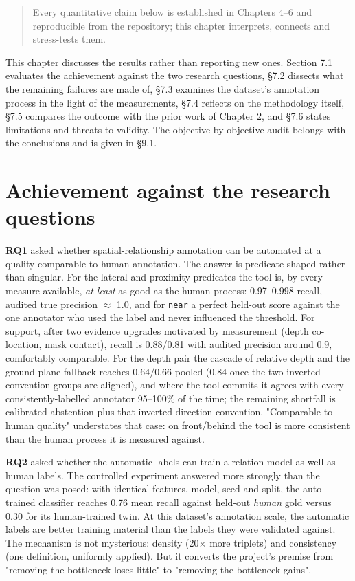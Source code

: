 
\begin{quote}
Every quantitative claim below is established in Chapters 4--6 and reproducible from the repository; this chapter interprets, connects and stress-tests them.
\end{quote}

This chapter discusses the results rather than reporting new ones. Section 7.1 evaluates the achievement against the two research questions, \S7.2 dissects what the remaining failures are made of, \S7.3 examines the dataset's annotation process in the light of the measurements, \S7.4 reflects on the methodology itself, \S7.5 compares the outcome with the prior work of Chapter 2, and \S7.6 states limitations and threats to validity. The objective-by-objective audit belongs with the conclusions and is given in \S9.1.

\section{Achievement against the research questions}

\textbf{RQ1} asked whether spatial-relationship annotation can be automated at a quality comparable to human annotation. The answer is predicate-shaped rather than singular. For the lateral and proximity predicates the tool is, by every measure available, \textit{at least} as good as the human process: 0.97--0.998 recall, audited true precision $\approx$ 1.0, and for \texttt{near} a perfect held-out score against the one annotator who used the label and never influenced the threshold. For support, after two evidence upgrades motivated by measurement (depth co-location, mask contact), recall is 0.88/0.81 with audited precision around 0.9, comfortably comparable. For the depth pair the cascade of relative depth and the ground-plane fallback reaches 0.64/0.66 pooled (0.84 once the two inverted-convention groups are aligned), and where the tool commits it agrees with every consistently-labelled annotator 95--100\% of the time; the remaining shortfall is calibrated abstention plus that inverted direction convention. "Comparable to human quality" understates that case: on front/behind the tool is more consistent than the human process it is measured against.

\textbf{RQ2} asked whether the automatic labels can train a relation model as well as human labels. The controlled experiment answered more strongly than the question was posed: with identical features, model, seed and split, the auto-trained classifier reaches 0.76 mean recall against held-out \textit{human} gold versus 0.30 for its human-trained twin. At this dataset's annotation scale, the automatic labels are better training material than the labels they were validated against. The mechanism is not mysterious: density (20$\times$ more triplets) and consistency (one definition, uniformly applied). But it converts the project's premise from "removing the bottleneck loses little" to "removing the bottleneck gains".

